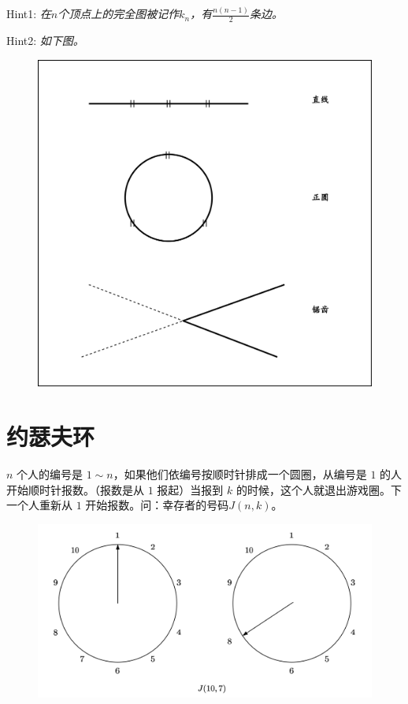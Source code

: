 \documentclass[12pt]{ctexart}
\begin{document}
\newpage
Hint1: \textit{在$n$个顶点上的完全图被记作$k_n$，有$\frac{n(n-1)}{2}$条边。}\newline

Hint2: \textit{如下图。}


\begin{figure}[htbp]
    \centering
    \includegraphics[width=0.75\linewidth]{assets/2-4.png}
\end{figure}




\newpage
\section{约瑟夫环}
$n$ 个人的编号是 $1 \sim n$，如果他们依编号按顺时针排成一个圆圈，从编号是 $1$ 的人开始顺时针报数。（报数是从 $1$ 报起）当报到 $k$ 的时候，这个人就退出游戏圈。下一个人重新从 $1$ 开始报数。问：幸存者的号码$J(n, k)$。\newline

\begin{figure}[htbp]
    \centering
    \includegraphics[width=0.8\linewidth]{assets/3-1.png}
\end{figure}
\end{document}
